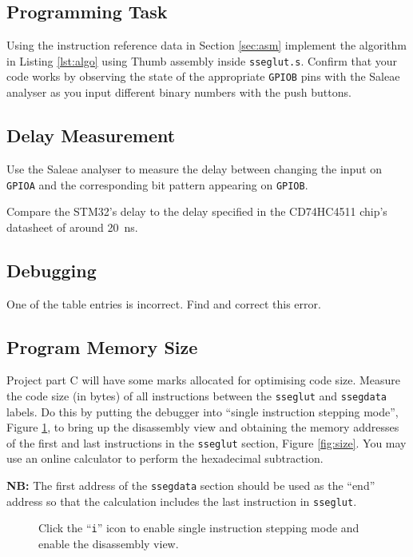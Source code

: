 \documentclass{UoNMCHA}
\numberwithin{equation}{section}
\begin{document}
\subsection{Programming Task}
Using the instruction reference data in Section \ref{sec:asm} implement the algorithm in Listing \ref{lst:algo} using Thumb assembly inside \texttt{sseglut.s}. Confirm that your code works by observing the state of the appropriate \texttt{GPIOB} pins with the Saleae analyser as you input different binary numbers with the push buttons.

\subsection{Delay Measurement}

Use the Saleae analyser to measure the delay between changing the input on \texttt{GPIOA} and the corresponding bit pattern appearing on \texttt{GPIOB}.

Compare the STM32's delay to the delay specified in the CD74HC4511 chip's datasheet of around 20~ns.


\subsection{Debugging}

One of the table entries is incorrect. Find and correct this error.

\subsection{Program Memory Size}

Project part C will have some marks allocated for optimising code size. Measure the code size (in bytes) of all instructions between the \texttt{sseglut} and \texttt{ssegdata} labels. Do this by putting the debugger into ``single instruction stepping mode'', Figure \ref{fig:step}, to bring up the disassembly view and obtaining the memory addresses of the first and last instructions in the \texttt{sseglut} section, Figure \ref{fig:size}. You may use an online calculator to perform the hexadecimal subtraction.

\textbf{NB:} The first address of the \texttt{ssegdata} section should be used as the ``end'' address so that the calculation includes the last instruction in \texttt{sseglut}.

\begin{figure}[h]
\caption{Click the ``\texttt{i}'' icon to enable single instruction stepping mode and enable the disassembly view.}\label{fig:step}
\end{figure}
\end{document}
